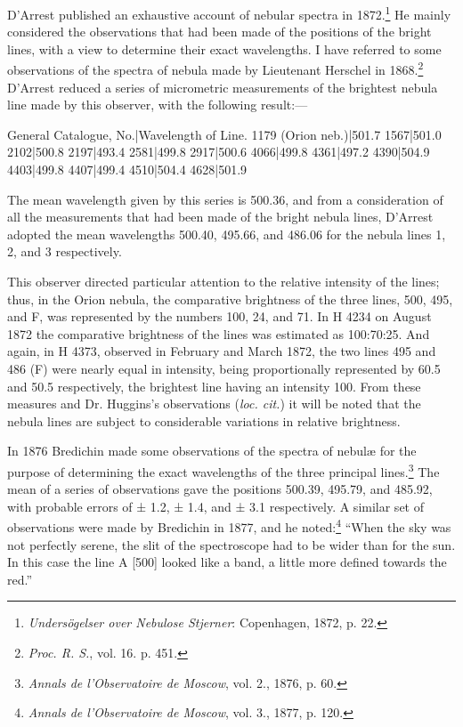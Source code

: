 \documentclass[a4paper, 12pt, oneside, polutonikogreek, english]{article}
\begin{document}
D'Arrest published an exhaustive account of nebular spectra in 1872.\footnote{\emph{Undersögelser over Nebulose Stjerner}: Copenhagen, 1872, p. 22.} He mainly considered the observations that had been made of the positions of the bright lines, with a view to determine their exact wavelengths. I have referred to some observations of the spectra of nebula made by Lieutenant Herschel in 1868.\footnote{\emph{Proc. R. S.}, vol. 16. p. 451.} D'Arrest reduced a series of micrometric measurements of the brightest nebula line made by this observer, with the following result:---

General Catalogue, No.|Wavelength of Line. 
1179 (Orion neb.)|501.7 
1567|501.0 
2102|500.8 
2197|493.4 
2581|499.8 
2917|500.6 
4066|499.8 
4361|497.2 
4390|504.9 
4403|499.8 
4407|499.4 
4510|504.4 
4628|501.9 

The mean wavelength given by this series is 500.36, and from a consideration of all the measurements that had been made of the bright nebula lines, D'Arrest adopted the mean wavelengths 500.40, 495.66, and 486.06 for the nebula lines 1, 2, and 3 respectively.

This observer directed particular attention to the relative intensity of the lines; thus, in the Orion nebula, the comparative brightness of the three lines, 500, 495, and F, was represented by the numbers 100, 24, and 71. In H 4234 on August 1872 the comparative brightness of the lines was estimated as 100:70:25. And again, in H 4373, observed in February and March 1872, the two lines 495 and 486 (F) were nearly equal in intensity, being proportionally represented by 60.5 and 50.5 respectively, the brightest line having an intensity 100. From these measures and Dr. Huggins's observations (\emph{loc. cit.}) it will be noted that the nebula lines are subject to considerable variations in relative brightness.

In 1876 Bredichin made some observations of the spectra of nebulæ for the purpose of determining the exact wavelengths of the three principal lines.\footnote{\emph{Annals de l'Observatoire de Moscow}, vol. 2., 1876, p. 60.} The mean of a series of observations gave the positions 500.39, 495.79, and 485.92, with probable errors of ± 1.2, ± 1.4, and ± 3.1 respectively. A similar set of observations were made by Bredichin in 1877, and he noted:\footnote{\emph{Annals de l'Observatoire de Moscow}, vol. 3., 1877, p. 120.} ``When the sky was not perfectly serene, the slit of the spectroscope had to be wider than for the sun. In this case the line A [500] looked like a band, a little more defined towards the red.''
\end{document}
